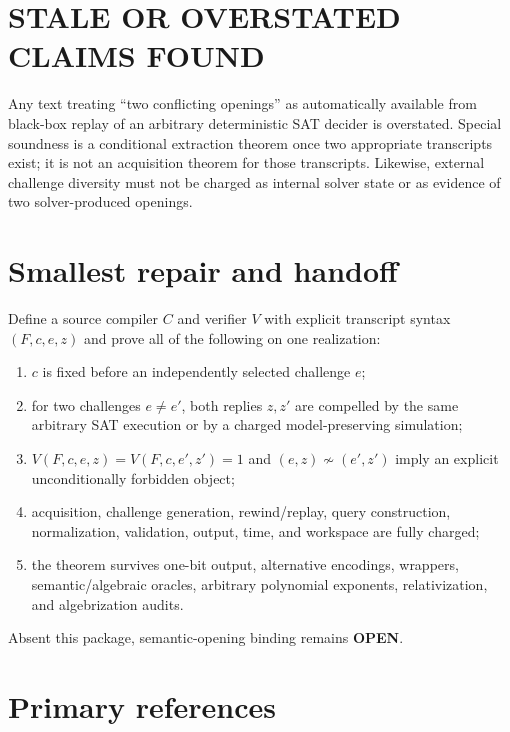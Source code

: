 \documentclass[11pt]{article}
\newcommand{\st}[1]{\textbf{#1}}
\begin{document}
\section*{STALE OR OVERSTATED CLAIMS FOUND}

Any text treating ``two conflicting openings'' as automatically available
from black-box replay of an arbitrary deterministic SAT decider is overstated.
Special soundness is a conditional extraction theorem once two appropriate
transcripts exist; it is not an acquisition theorem for those transcripts.
Likewise, external challenge diversity must not be charged as internal solver
state or as evidence of two solver-produced openings.

\section*{Smallest repair and handoff}

Define a source compiler $C$ and verifier $V$ with explicit transcript syntax
$(F,c,e,z)$ and prove all of the following on one realization:
\begin{enumerate}
\item $c$ is fixed before an independently selected challenge $e$;
\item for two challenges $e\ne e'$, both replies $z,z'$ are compelled by the
same arbitrary SAT execution or by a charged model-preserving simulation;
\item $V(F,c,e,z)=V(F,c,e',z')=1$ and $(e,z)\not\sim(e',z')$ imply an explicit
unconditionally forbidden object;
\item acquisition, challenge generation, rewind/replay, query construction,
normalization, validation, output, time, and workspace are fully charged;
\item the theorem survives one-bit output, alternative encodings, wrappers,
semantic/algebraic oracles, arbitrary polynomial exponents, relativization,
and algebrization audits.
\end{enumerate}
Absent this package, semantic-opening binding remains \st{OPEN}.

\section*{Primary references}
\end{document}

